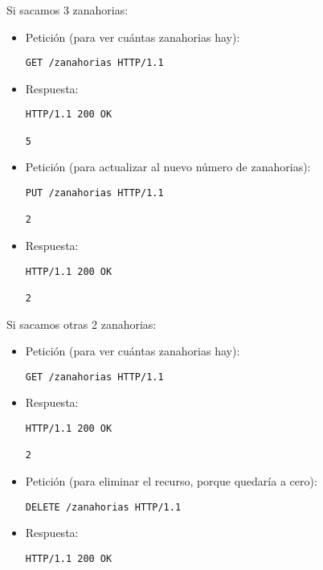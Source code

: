 Si sacamos 3 zanahorias:

\begin{itemize}
\item Petición (para ver cuántas zanahorias hay):
\begin{verbatim}
GET /zanahorias HTTP/1.1
\end{verbatim}

\item Respuesta:
\begin{verbatim}
HTTP/1.1 200 OK

5
\end{verbatim}

\item Petición (para actualizar al nuevo número de zanahorias):
\begin{verbatim}
PUT /zanahorias HTTP/1.1

2
\end{verbatim}

\item Respuesta:
\begin{verbatim}
HTTP/1.1 200 OK

2
\end{verbatim}

\end{itemize}

Si sacamos otras 2 zanahorias:

\begin{itemize}
\item Petición (para ver cuántas zanahorias hay):
\begin{verbatim}
GET /zanahorias HTTP/1.1
\end{verbatim}

\item Respuesta:
\begin{verbatim}
HTTP/1.1 200 OK

2
\end{verbatim}

\item Petición (para eliminar el recurso, porque quedaría a cero):
\begin{verbatim}
DELETE /zanahorias HTTP/1.1
\end{verbatim}

\item Respuesta:
\begin{verbatim}
HTTP/1.1 200 OK
\end{verbatim}

\end{itemize}



